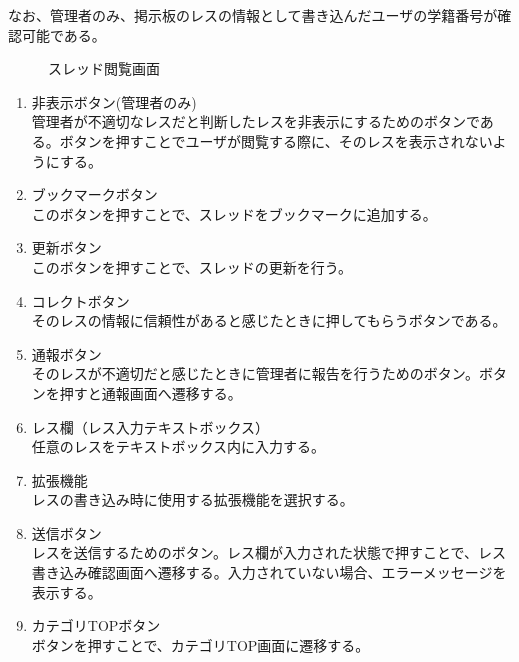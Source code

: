 \documentclass[a4j]{jarticle}
\begin{document}
なお、管理者のみ、掲示板のレスの情報として書き込んだユーザの学籍番号が確認可能である。

\begin{figure}[H]
\centering
{}
\caption{スレッド閲覧画面}
\label{fig:read_thread}
\end{figure}

\begin{enumerate}
  \renewcommand{\labelenumi}{\textcircled{\scriptsize \theenumi}}
\item 非表示ボタン(管理者のみ)\\
  管理者が不適切なレスだと判断したレスを非表示にするためのボタンである。ボタンを押すことでユーザが閲覧する際に、そのレスを表示されないようにする。

\item ブックマークボタン\\
  このボタンを押すことで、スレッドをブックマークに追加する。

\item 更新ボタン\\
  このボタンを押すことで、スレッドの更新を行う。

\item コレクトボタン\\
  そのレスの情報に信頼性があると感じたときに押してもらうボタンである。

\item 通報ボタン\\
  そのレスが不適切だと感じたときに管理者に報告を行うためのボタン。ボタンを押すと通報画面へ遷移する。

\item レス欄（レス入力テキストボックス）\\
  任意のレスをテキストボックス内に入力する。

\item 拡張機能\\
  レスの書き込み時に使用する拡張機能を選択する。

\item 送信ボタン\\
  レスを送信するためのボタン。レス欄が入力された状態で押すことで、レス書き込み確認画面へ遷移する。入力されていない場合、エラーメッセージを表示する。

\item カテゴリTOPボタン\\
  ボタンを押すことで、カテゴリTOP画面に遷移する。

\end{enumerate}
\end{document}
